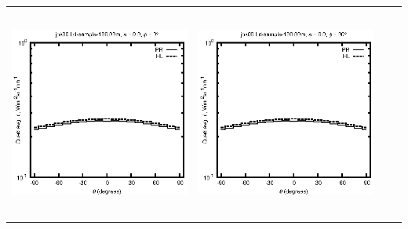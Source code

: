 \documentclass[10pt,a4paper]{article}
\begin{document}
\begin{adjustwidth}{-1.2in}{-1.2in}
\begin{tabular}{c c c c}
\includegraphics[height=7cm]{../eps/jok00_Ld_sample_100.00m_fwd.eps} &
\includegraphics[height=7cm]{../eps/jok00_Ld_sample_100.00m_cross.eps} \\
\end{tabular}

\pagebreak


\end{adjustwidth}
\end{document}
